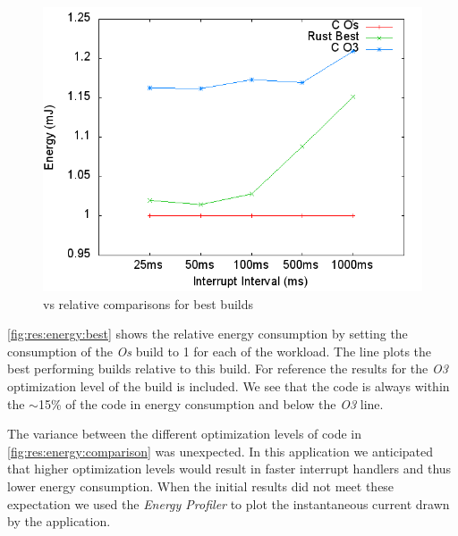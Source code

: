 \begin{figure}[H]
  \includegraphics[width=\textwidth]{results/plots/energy/best.png}
  \caption{{\rust} vs {\C} relative comparisons for best builds}
  \label{fig:res:energy:best}
\end{figure}

\autoref{fig:res:energy:best} shows the relative energy consumption by setting the consumption of the {\C} \emph{Os} build to 1 for each of the workload.
The {\rust} line plots the best performing {\rust} builds relative to this {\C} build.
For reference the results for the \emph{O3} optimization level of the {\C} build is included.
We see that the {\rust} code is always within the $\sim$15\% of the {\C} code in energy consumption and below the \emph{O3} line.


The variance between the different optimization levels of {\C} code in \autoref{fig:res:energy:comparison} was unexpected.
In this application we anticipated that higher optimization levels would result in faster interrupt handlers and thus lower energy consumption.
When the initial results did not meet these expectation we used the \emph{Energy Profiler} to plot the instantaneous current drawn by the application.

